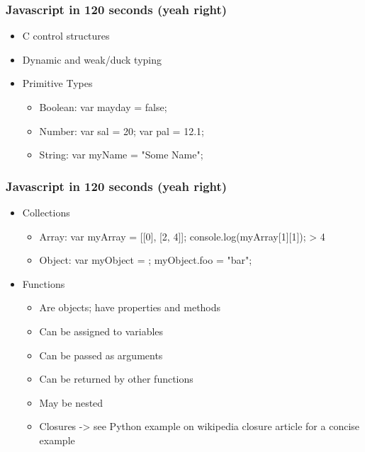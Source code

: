 \documentclass{beamer}
\begin{document}
\begin{frame}
    \frametitle{Javascript in 120 seconds (yeah right)}
    \begin{itemize}
    \item C control structures
    \item Dynamic and weak/duck typing
    \item Primitive Types
        \begin{itemize}
        \item Boolean: var mayday = false;
        \item Number: var sal = 20; var pal = 12.1;
        \item String: var myName = "Some Name";
        \end{itemize}
    \end{itemize}
\end{frame}


\begin{frame}
    \frametitle{Javascript in 120 seconds (yeah right)}
    \begin{itemize}
    \item Collections
        \begin{itemize}
        \item Array: var myArray = [[0], [2, 4]]; console.log(myArray[1][1]); > 4
        \item Object: var myObject = {}; myObject.foo = "bar";
        \end{itemize}
    \item Functions
        \begin{itemize}
        \item Are objects; have properties and methods
        \item Can be assigned to variables
        \item Can be passed as arguments
        \item Can be returned by other functions
        \item May be nested
        \item Closures -> see Python example on wikipedia closure article for a concise example
        \end{itemize}
    \end{itemize}
\end{frame}
\end{document}
